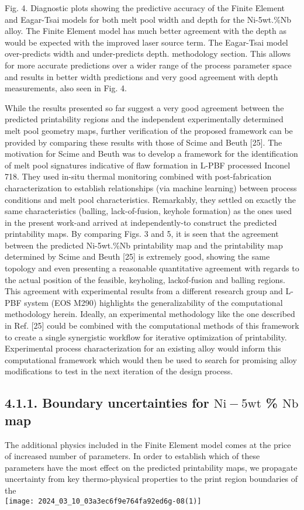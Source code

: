 \documentclass[10pt]{article}
\begin{document}
Fig. 4. Diagnostic plots showing the predictive accuracy of the Finite Element and Eagar-Tsai models for both melt pool width and depth for the Ni-5wt.\%Nb alloy. The Finite Element model has much better agreement with the depth as would be expected with the improved laser source term. The Eagar-Tsai model over-predicts width and under-predicts depth. methodology section. This allows for more accurate predictions over a wider range of the process parameter space and results in better width predictions and very good agreement with depth measurements, also seen in Fig. 4.

While the results presented so far suggest a very good agreement between the predicted printability regions and the independent experimentally determined melt pool geometry maps, further verification of the proposed framework can be provided by comparing these results with those of Scime and Beuth [25]. The motivation for Scime and Beuth was to develop a framework for the identification of melt pool signatures indicative of flaw formation in L-PBF processed Inconel 718. They used in-situ thermal monitoring combined with post-fabrication characterization to establish relationships (via machine learning) between process conditions and melt pool characteristics. Remarkably, they settled on exactly the same characteristics (balling, lack-of-fusion, keyhole formation) as the ones used in the present work-and arrived at independently-to construct the predicted printability maps. By comparing Figs. 3 and 5, it is seen that the agreement between the predicted Ni-5wt.\%Nb printability map and the printability map determined by Scime and Beuth [25] is extremely good, showing the same topology and even presenting a reasonable quantitative agreement with regards to the actual position of the feasible, keyholing, lackof-fusion and balling regions. This agreement with experimental results from a different research group and L-PBF system (EOS M290) highlights the generalizability of the computational methodology herein. Ideally, an experimental methodology like the one described in Ref. [25] could be combined with the computational methods of this framework to create a single synergistic workflow for iterative optimization of printability. Experimental process characterization for an existing alloy would inform this computational framework which would then be used to search for promising alloy modifications to test in the next iteration of the design process.

\subsection*{4.1.1. Boundary uncertainties for $\mathrm{Ni}-5 \mathrm{wt}$ \% $\mathrm{Nb}$ map}
The additional physics included in the Finite Element model comes at the price of increased number of parameters. In order to establish which of these parameters have the most effect on the predicted printability maps, we propagate uncertainty from key thermo-physical properties to the print region boundaries of the\\
\texttt{[image: 2024\_03\_10\_03a3ec6f9e764fa92ed6g-08(1)]}
\end{document}
